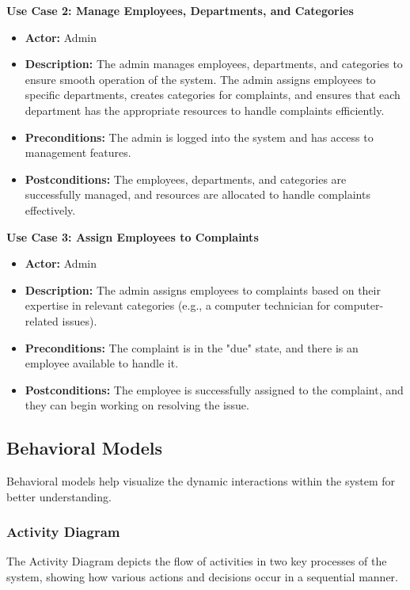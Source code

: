 \documentclass[a4paper,12pt]{article}
\begin{document}
\noindent \textbf{Use Case 2: Manage Employees, Departments, and Categories}
\begin{itemize}
    \item \textbf{Actor:} Admin
    \item \textbf{Description:} The admin manages employees, departments, and categories to ensure smooth operation of the system. The admin assigns employees to specific departments, creates categories for complaints, and ensures that each department has the appropriate resources to handle complaints efficiently.
    \item \textbf{Preconditions:} The admin is logged into the system and has access to management features.
    \item \textbf{Postconditions:} The employees, departments, and categories are successfully managed, and resources are allocated to handle complaints effectively.
\end{itemize}


\noindent \textbf{Use Case 3: Assign Employees to Complaints}
    \begin{itemize}
        \item \textbf{Actor:} Admin
        \item \textbf{Description:} The admin assigns employees to complaints based on their expertise in relevant categories (e.g., a computer technician for computer-related issues).
        \item \textbf{Preconditions:} The complaint is in the "due" state, and there is an employee available to handle it.
        \item \textbf{Postconditions:} The employee is successfully assigned to the complaint, and they can begin working on resolving the issue.
    \end{itemize}

\subsection{Behavioral Models}
Behavioral models help visualize the dynamic interactions within the system for better understanding.

\subsubsection{Activity Diagram}
The Activity Diagram depicts the flow of activities in two key processes of the system, showing how various actions and decisions occur in a sequential manner.
\end{document}
